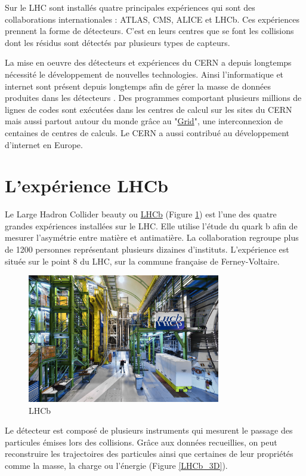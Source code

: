 \documentclass[a4paper,11pt]{report}
\begin{document}
Sur le LHC sont installés quatre principales expériences qui sont des collaborations internationales : ATLAS, CMS, ALICE et LHCb.
Ces expériences prennent la forme de détecteurs. C'est en leurs centres que se font les collisions dont les résidus sont détectés par plusieurs types de capteurs.

La mise en oeuvre des détecteurs et expériences du CERN a depuis longtemps nécessité le développement de nouvelles technologies.
Ainsi l'informatique et internet sont présent depuis longtemps afin de gérer la masse de données produites dans les détecteurs \cite{Saikumar:2022mgb}.
Des programmes comportant plusieurs millions de lignes de codes sont exécutées dans les centres de calcul sur les sites du CERN
mais aussi partout autour du monde grâce au "\href{https://wlcg-public.web.cern.ch/}{Grid}", une interconnexion de centaines de centres de calculs.
Le CERN a aussi contribué au développement d'internet en Europe.

\section{L'expérience LHCb}
Le Large Hadron Collider beauty ou \href{https://lhcb.web.cern.ch/}{LHCb} (Figure \ref{LHCb}) est l'une des quatre grandes expériences installées sur le LHC.
Elle utilise l'étude du quark b afin de mesurer l'asymétrie entre matière et antimatière.
La collaboration regroupe plus de 1200 personnes représentant plusieurs dizaines d'instituts.
L'expérience est située sur le point 8 du LHC, sur la commune française de Ferney-Voltaire.

\begin{figure}[!htb]
    \includegraphics[width=0.75\textwidth, center]{LHCb.jpg}
    \caption{LHCb}
    \label{LHCb}
\end{figure}

Le détecteur est composé de plusieurs instruments qui mesurent le passage des particules émises lors des collisions.
Grâce aux données recueillies, on peut reconstruire les trajectoires des particules ainsi que certaines de leur propriétés comme la masse, la charge ou l'énergie (Figure \ref{LHCb_3D}).
\end{document}
